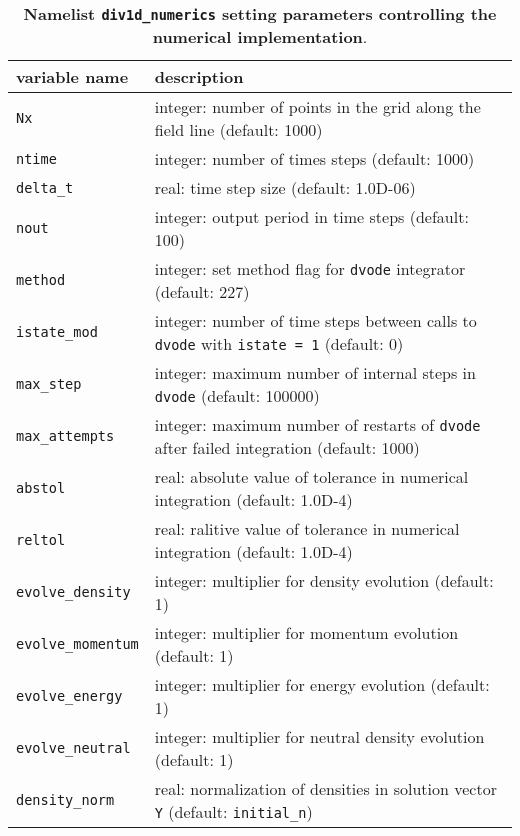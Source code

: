 \documentclass[amsmath,amssymb,a4]{revtex4}
\begin{document}
\begin{table}[h]
\begin{center}
  \caption{{\bf Namelist {\tt div1d\_numerics} setting parameters controlling the numerical implementation}.}
  \label{tab:input_numerics}
  \begin{tabular}{|| l  | l ||}
    \hline\hline
    variable name                & description \\ \hline\hline
    {\tt Nx}                     & integer: number of points in the grid along the field line (default: 1000) \\ \hline
    {\tt ntime}                  & integer: number of times steps (default: 1000)  \\ \hline
    {\tt delta\_t}               & real: time step size (default: 1.0D-06)  \\ \hline
    {\tt nout}                   & integer: output period in time steps (default: 100) \\ \hline
    {\tt method}                 & integer: set method flag for {\tt dvode} integrator (default: 227)   \\ \hline
	{\tt istate\_mod}            & integer: number of time steps between calls to {\tt dvode} with {\tt istate = 1} (default: 0) \\ \hline
	{\tt max\_step}              & integer: maximum number of internal steps in {\tt dvode} (default: 100000) \\ \hline
	{\tt max\_attempts}          & integer: maximum number of restarts of {\tt dvode} after failed integration (default: 1000) \\ \hline
    {\tt abstol}                 & real: absolute value of tolerance in numerical integration (default: 1.0D-4)  \\ \hline
    {\tt reltol}                 & real: ralitive value of tolerance in numerical integration (default: 1.0D-4)  \\ \hline
	{\tt evolve\_density}        & integer: multiplier for density evolution (default: 1) \\ \hline
	{\tt evolve\_momentum}       & integer: multiplier for momentum evolution (default: 1) \\ \hline
	{\tt evolve\_energy}         & integer: multiplier for energy evolution (default: 1) \\ \hline
	{\tt evolve\_neutral}        & integer: multiplier for neutral density evolution (default: 1) \\ \hline
	{\tt density\_norm}          & real: normalization of densities in solution vector {\tt Y} (default: {\tt initial\_n}) \\ \hline

\end{tabular}
\end{center}
\end{table}
\end{document}
